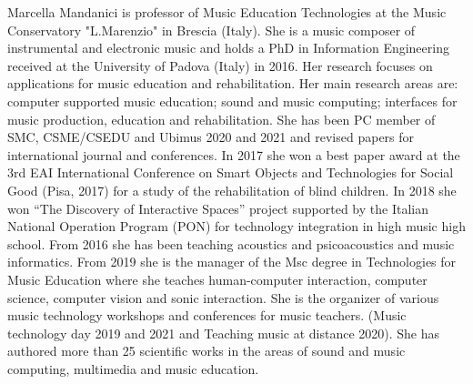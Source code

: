\documentclass[10pt,journal,compsoc]{IEEEtran}
\begin{document}



% 

\begin{IEEEbiography}{Marcella Mandanici} is professor of Music Education Technologies at the Music Conservatory "L.Marenzio" in Brescia (Italy). She is a music composer of instrumental and electronic music and holds a PhD in Information Engineering received at the University of Padova (Italy) in 2016. Her research focuses on applications for music education and rehabilitation. 
Her main research areas are: computer supported music education; sound and music computing; interfaces for music production, education and rehabilitation. She has been PC member of SMC, CSME/CSEDU and Ubimus 2020 and 2021 and revised papers for international journal and conferences. In 2017 she won a best paper award at the 3rd EAI International Conference on Smart Objects and Technologies for Social Good (Pisa, 2017) for a study of the rehabilitation of blind children. In 2018 she won “The Discovery of Interactive Spaces” project supported by the Italian National Operation Program (PON) for technology integration in high music high school. From 2016 she has been teaching acoustics and psicoacoustics and music informatics. From 2019 she is the manager of the Msc degree in Technologies for Music Education where she teaches human-computer interaction, computer science, computer vision and sonic interaction. She is the organizer of various music technology workshops and conferences for music teachers. (Music technology day 2019 and 2021 and Teaching music at distance 2020). She has authored more than 25 scientific works in the areas of sound and music computing, multimedia and music education.
\end{IEEEbiography}
\end{document}
